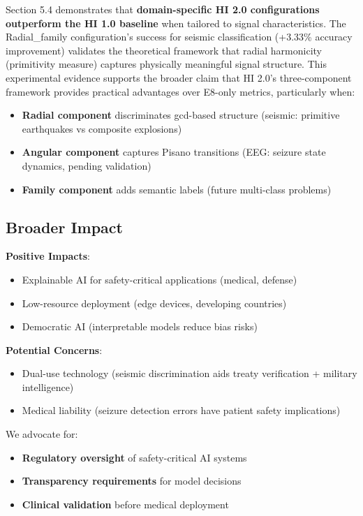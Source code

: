 \documentclass[11pt]{article}
\theoremstyle{remark}
\begin{document}
Section 5.4 demonstrates that \textbf{domain-specific HI 2.0 configurations outperform the HI 1.0 baseline} when tailored to signal characteristics. The Radial\_family configuration's success for seismic classification (+3.33\% accuracy improvement) validates the theoretical framework that radial harmonicity (primitivity measure) captures physically meaningful signal structure. This experimental evidence supports the broader claim that HI 2.0's three-component framework provides practical advantages over E8-only metrics, particularly when:
\begin{itemize}
\item \textbf{Radial component} discriminates gcd-based structure (seismic: primitive earthquakes vs composite explosions)
\item \textbf{Angular component} captures Pisano transitions (EEG: seizure state dynamics, pending validation)
\item \textbf{Family component} adds semantic labels (future multi-class problems)
\end{itemize}

\subsection{Broader Impact}

\textbf{Positive Impacts}:
\begin{itemize}
\item Explainable AI for safety-critical applications (medical, defense)
\item Low-resource deployment (edge devices, developing countries)
\item Democratic AI (interpretable models reduce bias risks)
\end{itemize}

\textbf{Potential Concerns}:
\begin{itemize}
\item Dual-use technology (seismic discrimination aids treaty verification + military intelligence)
\item Medical liability (seizure detection errors have patient safety implications)
\end{itemize}

We advocate for:
\begin{itemize}
\item \textbf{Regulatory oversight} of safety-critical AI systems
\item \textbf{Transparency requirements} for model decisions
\item \textbf{Clinical validation} before medical deployment
\end{itemize}
\end{document}
